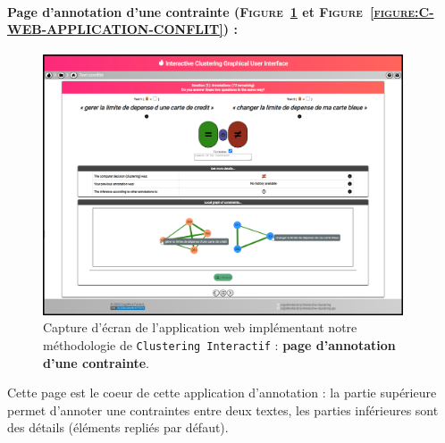 	
		\paragraph{Page d'annotation d'une contrainte (\textsc{Figure~\ref{figure:C-WEB-APPLICATION-ANNOTATION}} et \textsc{Figure~\ref{figure:C-WEB-APPLICATION-CONFLIT}}) :}
		
			\begin{figure}[H]
				\centering
				\includegraphics[width=0.95\textwidth]{figures/interactive-clustering-application-annotation-0full}
				\caption{
					Capture d'écran de l'application web implémentant notre méthodologie de \texttt{Clustering Interactif} : \textbf{page d'annotation d'une contrainte}.
				}
				\label{figure:C-WEB-APPLICATION-ANNOTATION}
			\end{figure}
			
			Cette page est le coeur de cette application d'annotation : la partie supérieure permet d'annoter une contraintes entre deux textes, les parties inférieures sont des détails (éléments repliés par défaut).
			
